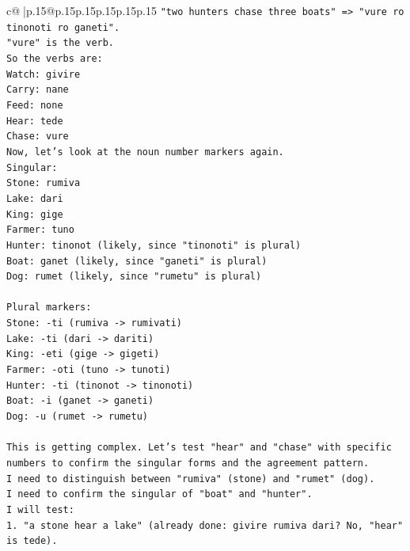 \documentclass{article}
\begin{document}
{\begin{supertabular}{c@{$\;$}|p{.15\linewidth}@{}p{.15\linewidth}p{.15\linewidth}p{.15\linewidth}p{.15\linewidth}p{.15\linewidth}}
{{{\texttt{"two hunters chase three boats" => "vure ro tinonoti ro ganeti".} \\
\texttt{"vure" is the verb.} \\
\texttt{So the verbs are:} \\
\texttt{Watch: givire} \\
\texttt{Carry: nane} \\
\texttt{Feed: none} \\
\texttt{Hear: tede} \\
\texttt{Chase: vure} \\
\texttt{Now, let's look at the noun number markers again.} \\
\texttt{Singular:} \\
\texttt{Stone: rumiva} \\
\texttt{Lake: dari} \\
\texttt{King: gige} \\
\texttt{Farmer: tuno} \\
\texttt{Hunter: tinonot (likely, since "tinonoti" is plural)} \\
\texttt{Boat: ganet (likely, since "ganeti" is plural)} \\
\texttt{Dog: rumet (likely, since "rumetu" is plural)} \\
\\ 
\texttt{Plural markers:} \\
\texttt{Stone: {-}ti (rumiva {-}> rumivati)} \\
\texttt{Lake: {-}ti (dari {-}> dariti)} \\
\texttt{King: {-}eti (gige {-}> gigeti)} \\
\texttt{Farmer: {-}oti (tuno {-}> tunoti)} \\
\texttt{Hunter: {-}ti (tinonot {-}> tinonoti)} \\
\texttt{Boat: {-}i (ganet {-}> ganeti)} \\
\texttt{Dog: {-}u (rumet {-}> rumetu)} \\
\\ 
\texttt{This is getting complex. Let's test "hear" and "chase" with specific numbers to confirm the singular forms and the agreement pattern.} \\
\texttt{I need to distinguish between "rumiva" (stone) and "rumet" (dog).} \\
\texttt{I need to confirm the singular of "boat" and "hunter".} \\
\texttt{I will test:} \\
\texttt{1. "a stone hear a lake" (already done: givire rumiva dari? No, "hear" is tede).} \\
}}}
\end{supertabular}}
\end{document}
